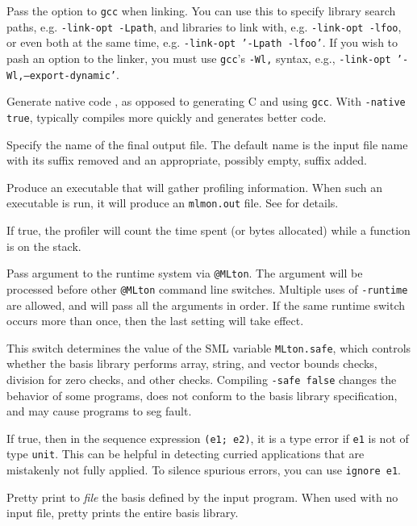 \begin{description}
Pass the option to {\tt gcc} when linking.  You can use this to
specify library search paths, e.g. {\tt -link-opt -Lpath}, and
libraries to link with, e.g. {\tt -link-opt -lfoo}, or even both at
the same time, e.g. {\tt -link-opt '-Lpath -lfoo'}.  If you wish to
pash an option to the linker, you must use {\tt gcc}'s {\tt -Wl,}
syntax, e.g., {\tt -link-opt '-Wl,--export-dynamic'}.

Generate native code , as opposed to generating C and using {\tt gcc}.
With {\tt -native true}, {\mlton} typically compiles more quickly and
generates better code.

Specify the name of the final output file. The default name is the
input file name with its suffix removed and an appropriate, possibly
empty, suffix added.

Produce an executable that will gather profiling information.  When
such an executable is run, it will produce an {\tt mlmon.out} file.
See  for details.

If true, the profiler will count the time spent (or bytes allocated)
while a function is on the stack.

Pass argument to the runtime system via {\tt @MLton}.  The argument
will be processed before other {\tt @MLton} command line switches.
Multiple uses of {\tt -runtime} are allowed, and will pass all the
arguments in order.  If the same runtime switch occurs more than once,
then the last setting will take effect.

This switch determines the value of the SML variable {\tt MLton.safe},
which controls whether the basis library performs array, string, and
vector bounds checks, division for zero checks, and other checks.
Compiling {\tt -safe false} changes the behavior of some programs,
does not conform to the basis library specification, and may cause
programs to seg fault.

If true, then in the sequence expression {\tt (e1; e2)}, it is a type
error if {\tt e1} is not of type {\tt unit}.  This can be helpful in
detecting curried applications that are mistakenly not fully applied.
To silence spurious errors, you can use {\tt ignore e1}.

Pretty print to {\it file} the basis defined by the input program.
When used with no input file, {\mlton} pretty prints the entire basis
library.


\end{description}
